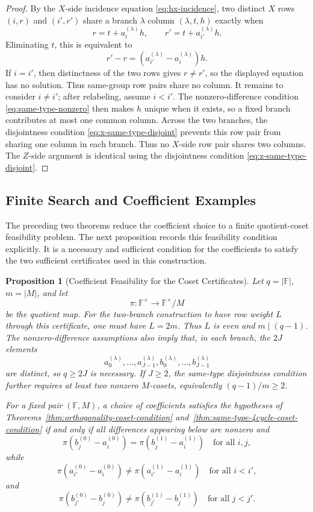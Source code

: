 \documentclass[11pt,a4paper]{article}
\newcommand{\F}{\mathbb{F}}
\theoremstyle{uprighttheorem}
\newtheorem{proposition}{Proposition}
\begin{document}
\begin{proof}
By the \(X\)-side incidence equation \eqref{eq:hx-incidence}, two distinct $X$ rows $(i,r)$ and $(i',r')$ share a branch \(\lambda\) column $(\lambda,t,h)$ exactly when
\[
  r=t+a_i^{(\lambda)}h,\qquad
  r'=t+a_{i'}^{(\lambda)}h.
\]
Eliminating \(t\), this is equivalent to
\[
  r'-r=(a_{i'}^{(\lambda)}-a_i^{(\lambda)})h.
\]
If $i=i'$, then distinctness of the two rows gives $r\ne r'$, so the displayed equation has no solution.
Thus same-group row pairs share no column.
It remains to consider $i\ne i'$; after relabeling, assume $i<i'$.
The nonzero-difference condition \eqref{eq:same-type-nonzero} then makes $h$ unique when it exists, so a fixed branch contributes at most one common column.
Across the two branches, the disjointness condition \eqref{eq:x-same-type-disjoint} prevents this row pair from sharing one column in each branch.
Thus no $X$-side row pair shares two columns.
The $Z$-side argument is identical using the disjointness condition \eqref{eq:z-same-type-disjoint}.
\end{proof}

\subsection{Finite Search and Coefficient Examples}\label{subsec:coefficient-search}

The preceding two theorems reduce the coefficient choice to a finite quotient-coset feasibility problem.
The next proposition records this feasibility condition explicitly.
It is a necessary and sufficient condition for the coefficients to satisfy the two sufficient certificates used in this construction.

\begin{proposition}[Coefficient Feasibility for the Coset Certificates]\label{prop:coefficient-feasibility}
Let \(q=|\F|\), \(m=|M|\), and let
\[
  \pi:\F^\times\to \F^\times/M
\]
be the quotient map.
For the two-branch construction to have row weight \(L\) through this certificate, one must have \(L=2m\).
Thus \(L\) is even and \(m\mid(q-1)\).
The nonzero-difference assumptions also imply that, in each branch, the \(2J\) elements
\[
  a_0^{(\lambda)},\ldots,a_{J-1}^{(\lambda)},
  b_0^{(\lambda)},\ldots,b_{J-1}^{(\lambda)}
\]
are distinct, so \(q\ge 2J\) is necessary.
If \(J\ge2\), the same-type disjointness condition further requires at least two nonzero \(M\)-cosets, equivalently \((q-1)/m\ge2\).

For a fixed pair \((\F,M)\), a choice of coefficients satisfies the hypotheses of Theorems~\ref{thm:orthogonality-coset-condition} and~\ref{thm:same-type-4cycle-coset-condition} if and only if all differences appearing below are nonzero and
\[
  \pi(b_j^{(0)}-a_i^{(0)})
  =
  \pi(b_j^{(1)}-a_i^{(1)})
  \quad\text{for all }i,j,
\]
while
\[
  \pi(a_{i'}^{(0)}-a_i^{(0)})
  \ne
  \pi(a_{i'}^{(1)}-a_i^{(1)})
  \quad\text{for all }i<i',
\]
and
\[
  \pi(b_{j'}^{(0)}-b_j^{(0)})
  \ne
  \pi(b_{j'}^{(1)}-b_j^{(1)})
  \quad\text{for all }j<j'.
\]
\end{proposition}
\end{document}
